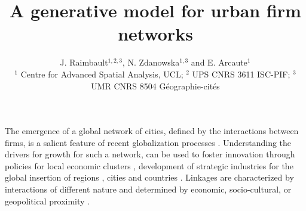 \documentclass[10pt,letterpaper]{article}
\title{\vspace{-2cm}A generative model for urban firm networks}
\author{J. Raimbault$^{1,2,3}$, N. Zdanowska$^{1,3}$ and E. Arcaute$^1$\\\medskip\small
$^{1}$ Centre for Advanced Spatial Analysis, UCL; $^{2}$ UPS CNRS 3611 ISC-PIF; $^{3}$ UMR CNRS 8504 G{\'e}ographie-cit{\'e}s
}
\date{}
\newcommand{\ea}[1]{{\color{blue}  #1}}
\begin{document}
\maketitle




The emergence of a global network of cities, defined by the interactions between firms, is a salient feature of recent globalization processes \cite{taylor2001specification}.  
\ea{Understanding the drivers for growth for such a network, can be used to foster innovation through} 
policies for local economic clusters \cite{turkina2016structure}, \ea{development of strategic industries for the global insertion of regions}
\cite{dawley2019creating}, 
cities \cite{gluckler2016relational} and
countries \cite{martinus2019brokerage}.\ea{Linkages are characterized by interactions of different nature and determined by economic, socio-cultural, or geopolitical proximity \cite{martinus2018global}.}
\end{document}
